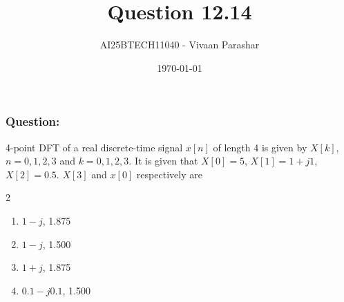 \documentclass{beamer}
\title{Question 12.14}
\author{AI25BTECH11040 - Vivaan Parashar}
\date{\today}
\begin{document}
\frame{\titlepage}

\begin{frame}
    \frametitle{Question: }
    4-point DFT of a real discrete-time signal $x[n]$ of length 4 is given by $X[k]$, $n = 0, 1, 2, 3$ and $k = 0, 1, 2, 3$. It is given that $X[0] = 5$, $X[1] = 1 + j1$, $X[2] = 0.5$. $X[3]$ and $x[0]$ respectively are
    \begin{multicols}{2}
        \begin{enumerate}[label=\alph*)]
            \item $1 - j$, 1.875
            \item $1 - j$, 1.500
            \item $1 + j$, 1.875
            \item $0.1 - j0.1$, 1.500
        \end{enumerate}
    \end{multicols}
\end{frame}
\end{document}
